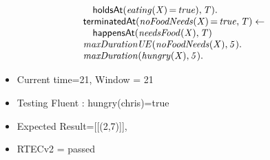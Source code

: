 \documentclass[8pt]{beamer}
\DeclareMathOperator{\val}{=}  %
\def \patsize {}
\def\happensAt{\textsf{\patsize happensAt}}
\def\holdsAt{\textsf{\patsize holdsAt}}
\def\terminatedAt{\textsf{\patsize terminatedAt}}
\newenvironment{mysplit}%
  {\arraycolsep 0pt \begin{array}{l}}%
  {\end{array}}
\begin{document}
\begin{frame}
\begin{minipage}{0.55\linewidth}
\begin{align*}
\begin{mysplit}
                \quad    \holdsAt\mathit{(eating(X)\val true),T).}\\
                \terminatedAt\mathit{(noFoodNeeds(X)\val true,T)\leftarrow}\\
                \quad    \happensAt\mathit{(needsFood(X),T)}\\
                \mathit{maxDurationUE(noFoodNeeds(X),5).}\\
                \mathit{maxDuration(hungry(X),5).}\\
            \end{mysplit}
        \end{align*}
    \end{minipage}
    \begin{itemize}
        \item Current time=21, Window = 21
        \item Testing Fluent :  hungry(chris)=true
        \item Expected Result=[[(2,7)]],
        \item RTECv2 = passed
    \end{itemize}
\end{frame}
\end{document}
